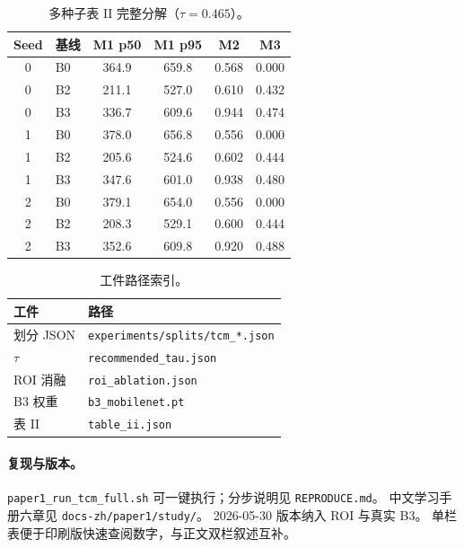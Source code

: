 \begin{table}[h]
\centering
\caption{多种子表 II 完整分解（$\tau{=}0.465$）。}
\label{tab:seed-breakdown-zh}
\small
\begin{tabular}{clcccc}
\hline
Seed & 基线 & M1 p50 & M1 p95 & M2 & M3 \\
\hline
0 & B0 & 364.9 & 659.8 & 0.568 & 0.000 \\
0 & B2 & 211.1 & 527.0 & 0.610 & 0.432 \\
0 & B3 & 336.7 & 609.6 & 0.944 & 0.474 \\
1 & B0 & 378.0 & 656.8 & 0.556 & 0.000 \\
1 & B2 & 205.6 & 524.6 & 0.602 & 0.444 \\
1 & B3 & 347.6 & 601.0 & 0.938 & 0.480 \\
2 & B0 & 379.1 & 654.0 & 0.556 & 0.000 \\
2 & B2 & 208.3 & 529.1 & 0.600 & 0.444 \\
2 & B3 & 352.6 & 609.8 & 0.920 & 0.488 \\
\hline
\end{tabular}
\end{table}

\begin{table}[h]
\centering
\caption{工件路径索引。}
\label{tab:artifact-paths-zh}
\small
\begin{tabular}{ll}
\hline
工件 & 路径 \\
\hline
划分 JSON & \texttt{experiments/splits/tcm\_*.json} \\
$\tau$ & \texttt{recommended\_tau.json} \\
ROI 消融 & \texttt{roi\_ablation.json} \\
B3 权重 & \texttt{b3\_mobilenet.pt} \\
表 II & \texttt{table\_ii.json} \\
\hline
\end{tabular}
\end{table}

\twocolumn

\paragraph{复现与版本。}
\texttt{paper1\_run\_tcm\_full.sh} 可一键执行；分步说明见 \texttt{REPRODUCE.md}。
中文学习手册六章见 \texttt{docs-zh/paper1/study/}。
2026-05-30 版本纳入 ROI 与真实 B3。
单栏表便于印刷版快速查阅数字，与正文双栏叙述互补。
